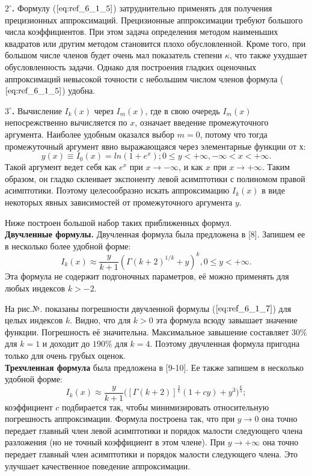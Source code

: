 \textbf{$2^{\circ}$.} Формулу ($\ref{eq:ref_6_1_5}$) затруднительно применять для получения прецизионных аппроксимаций. Прецизионные аппроксимации требуют большого числа коэффициентов. При этом задача определения методом наименьших квадратов или другим методом становится плохо обусловленной. Кроме того, при большом числе членов будет очень мал показатель степени $\kappa$, что также ухудшает обусловленность задачи. Однако для построения гладких оценочных аппроксимаций невысокой точности с небольшим числом членов формула ($\ref{eq:ref_6_1_5}$) удобна.

\textbf{$3^{\circ}$.} Вычисление $I_k(x)$ через $I_m(x)$, где в свою очередь $I_m(x)$ непосрежственно вычисляется по $x$, означает введение промежуточного аргумента. Наиболее удобным оказался выбор $m=0$, потому что тогда промежуточный аргумент явно выражающаяся через элементарные функции от $х$:
\begin{equation}
y(x) \equiv I_0(x) = ln(1+e^x); 0 \leqslant y < +\infty, -\infty < x < +\infty.
\label{eq:ref_6_1_6}
\end{equation}
Такой аргумент ведет себя как $e^x$ при $x \to -\infty$, и как $x$ при $x \to +\infty$. Таким образом, он гладко склеивает экспоненту левой асимптотики с полиномом правой асимптотики. Поэтому целесообразно искать аппроксимацию $I_k(x)$ в виде некоторых явных зависимостей от промежуточного аргумента $y$.

Ниже построен большой набор таких приближенных формул.
\\

\textbf{Двучленные формулы.} Двучленная формула была предложена в [8]. Запишем ее в несколько более удобной форме:
\begin{equation}
I_k(x) \approx \frac{y}{k+1}(\Gamma(k+2)^{1/k} + y)^k, 0 \leqslant y < +\infty.
\label{eq:ref_6_1_7}
\end{equation}
Эта формула не содержит подгоночных параметров, её можно применять для любых индексов $k > -2$.

На рис.№. показаны погрешности двучленной формулы ($\ref{eq:ref_6_1_7}$) для целых индексов $k$. Видно, что для $k > 0$ эта формула всюду
завышает значение функции. Погрешность её значительна. Максимальное завышение
составляет $30 \% $ для $k = 1$ и доходит до $190 \%$ для $k = 4$. Поэтому двучленная формула пригодна
только для очень грубых оценок.
\\

\textbf{Трехчленная формула} была предложена в [9-10]. Ее также запишем в несколько
удобной форме:
\begin{equation}
I_k(x) \approx \frac{y}{k+1} \bigg( [\Gamma(k+2)]^{\frac{3}{k}}(1+cy) + y^3 \bigg)^{\frac{k}{3}};
\label{eq:ref_6_1_8}
\end{equation}
коэффициент $c$ подбирается так, чтобы минимизировать относительную погрешность
аппроксимации. Формула построена так, что при $y \to 0$ она точно передает главный
член левой асимптотики и порядок малости следующего члена разложения (но не точный
 коэффициент в этом члене). При $y \to +\infty$ она точно передает главный член асимптотики и порядок малости следующего члена. Это улучшает качественное поведение
аппроксимации.

